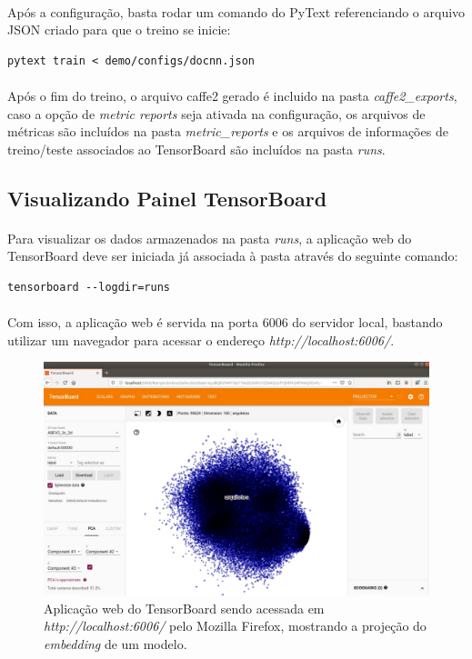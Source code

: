 \documentclass[grad,numbers]{coppe}
\begin{document}
			\paragraph{}Após a configuração, basta rodar um comando do PyText referenciando o arquivo JSON criado para que o treino se inicie:
			\begin{verbatim}
pytext train < demo/configs/docnn.json
			\end{verbatim}
			\paragraph{}Após o fim do treino, o arquivo caffe2 gerado é incluido na pasta \textit{caffe2\_exports}, caso a opção de \textit{metric reports} seja ativada na configuração, os arquivos de métricas são incluídos na pasta \textit{metric\_reports} e os arquivos de informações de treino/teste associados ao TensorBoard são incluídos na pasta \textit{runs}.
		\subsection{Visualizando Painel TensorBoard}
			\paragraph{}Para visualizar os dados armazenados na pasta \textit{runs}, a aplicação web do TensorBoard deve ser iniciada já associada à pasta através do seguinte comando:
			\begin{verbatim}
tensorboard --logdir=runs
			\end{verbatim}
			\paragraph{}Com isso, a aplicação web é servida na porta 6006 do servidor local, bastando utilizar um navegador para acessar o endereço \textit{http://localhost:6006/}.
 			\begin{figure}[h]
				{\includegraphics[width=15cm]{tensorboard-workinglocal.jpg}
					\caption{Aplicação web do TensorBoard sendo acessada em \textit{http://localhost:6006/} pelo Mozilla Firefox, mostrando a projeção do \textit{embedding} de um modelo.}
					\label{fig:tensorboard-workinglocal-fig}}
			\end{figure}
\end{document}
